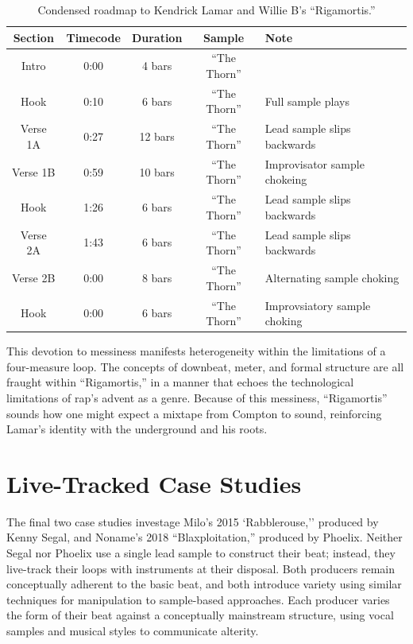     \begin{table}[ht]
        \centering
            \begin{tabular}{|c|c|c|c|l|}
                \hline
                Section  & Timecode & Duration & Sample        & Note \\ \hline
                Intro    & 0:00     & 4 bars   & ``The Thorn'' & \\ \hline
                Hook     & 0:10     & 6 bars   & ``The Thorn'' & Full sample plays \\ \hline
                Verse 1A & 0:27     & 12 bars  & ``The Thorn'' & Lead sample slips backwards \\ \hline
                Verse 1B & 0:59     & 10 bars  & ``The Thorn'' & Improvisator sample chokeing \\ \hline
                Hook     & 1:26     & 6 bars   & ``The Thorn'' & Lead sample slips backwards \\ \hline
                Verse 2A & 1:43     & 6 bars   & ``The Thorn'' & Lead sample slips backwards \\ \hline
                Verse 2B & 0:00     & 8 bars   & ``The Thorn'' & Alternating sample choking \\ \hline
                Hook     & 0:00     & 6 bars   & ``The Thorn'' & Improvsiatory sample choking\\ \hline
            \end{tabular}
        \caption{Condensed roadmap to Kendrick Lamar and Willie B's ``Rigamortis.''}
        \label{tab:rigamortis}
    \end{table}

\normalsize This devotion to messiness manifests heterogeneity within the limitations of a four-measure loop. The concepts of downbeat, meter, and formal structure are all fraught within ``Rigamortis,'' in a manner that echoes the technological limitations of rap's advent as a genre. Because of this messiness, ``Rigamortis'' sounds how one might expect a mixtape from Compton to sound, reinforcing Lamar's identity with the underground and his roots.

\section{Live-Tracked Case Studies}
The final two case studies investage Milo's 2015 `Rabblerouse,'' produced by Kenny Segal, and Noname's 2018 ``Blaxploitation,'' produced by Phoelix. Neither Segal nor Phoelix use a single lead sample to construct their beat; instead, they live-track their loops with instruments at their disposal. Both producers remain conceptually adherent to the basic beat, and both introduce variety using similar techniques for manipulation to sample-based approaches. Each producer varies the form of their beat against a conceptually mainstream structure, using vocal samples and musical styles to communicate alterity.

